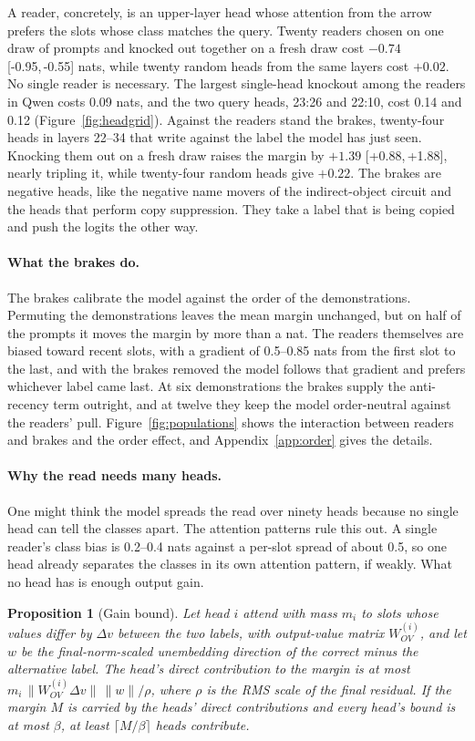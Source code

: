 \documentclass{article}
\newtheorem{proposition}{Proposition}
\newcommand{\ci}[2]{[#1,\,#2]}
\begin{document}
A reader, concretely, is an upper-layer head whose attention from the arrow prefers the slots whose class matches the query. Twenty readers chosen on one draw of prompts and knocked out together on a fresh draw cost $-0.74$ \ci{-0.95}{-0.55} nats, while twenty random heads from the same layers cost $+0.02$. No single reader is necessary. The largest single-head knockout among the readers in Qwen costs 0.09 nats, and the two query heads, 23:26 and 22:10, cost 0.14 and 0.12 (Figure~\ref{fig:headgrid}). Against the readers stand the brakes, twenty-four heads in layers 22--34 that write against the label the model has just seen. Knocking them out on a fresh draw raises the margin by $+1.39$ \ci{+0.88}{+1.88}, nearly tripling it, while twenty-four random heads give $+0.22$. The brakes are negative heads, like the negative name movers of the indirect-object circuit and the heads that perform copy suppression. They take a label that is being copied and push the logits the other way.

\paragraph{What the brakes do.} The brakes calibrate the model against the order of the demonstrations. Permuting the demonstrations leaves the mean margin unchanged, but on half of the prompts it moves the margin by more than a nat. The readers themselves are biased toward recent slots, with a gradient of 0.5--0.85 nats from the first slot to the last, and with the brakes removed the model follows that gradient and prefers whichever label came last. At six demonstrations the brakes supply the anti-recency term outright, and at twelve they keep the model order-neutral against the readers' pull. Figure~\ref{fig:populations} shows the interaction between readers and brakes and the order effect, and Appendix~\ref{app:order} gives the details.

\paragraph{Why the read needs many heads.} One might think the model spreads the read over ninety heads because no single head can tell the classes apart. The attention patterns rule this out. A single reader's class bias is 0.2--0.4 nats against a per-slot spread of about 0.5, so one head already separates the classes in its own attention pattern, if weakly. What no head has is enough output gain.

\begin{proposition}[Gain bound]\label{prop:gain}
Let head $i$ attend with mass $m_i$ to slots whose values differ by $\Delta v$ between the two labels, with output-value matrix $W_{OV}^{(i)}$, and let $w$ be the final-norm-scaled unembedding direction of the correct minus the alternative label. The head's direct contribution to the margin is at most $m_i\,\|W_{OV}^{(i)}\Delta v\|\,\|w\|/\rho$, where $\rho$ is the RMS scale of the final residual. If the margin $M$ is carried by the heads' direct contributions and every head's bound is at most $\beta$, at least $\lceil M/\beta \rceil$ heads contribute.
\end{proposition}
\end{document}
